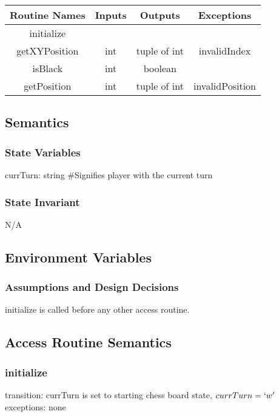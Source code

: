 \documentclass[12pt, titlepage]{article}
\begin{document}
        \begin{center}
            \begin{tabular}{|c|c|c|c|} 
                \hline
                Routine Names & Inputs & Outputs & Exceptions \\
                \hline
                initialize &  &  & \\ 
                \hline
                getXYPosition & int & tuple of int & invalidIndex \\ 
                \hline
                isBlack & int & boolean & \\ 
                \hline
                getPosition & int & tuple of int & invalidPosition \\ 
                \hline
            \end{tabular}
        \end{center}
    
    \subsection*{Semantics}
        \subsubsection*{State Variables}
            currTurn: string \#Signifies player with the current turn
            
        \subsubsection*{State Invariant}
            N/A
            
    \subsection*{Environment Variables}
            
        \subsubsection*{Assumptions and Design Decisions}
            initialize is called before any other access routine.
            
    \subsection*{Access Routine Semantics}
    
        \subsubsection*{initialize}
            transition: currTurn is set to starting chess board state, $currTurn = `w'$ \\ 
            exceptions: none
    
\end{document}

